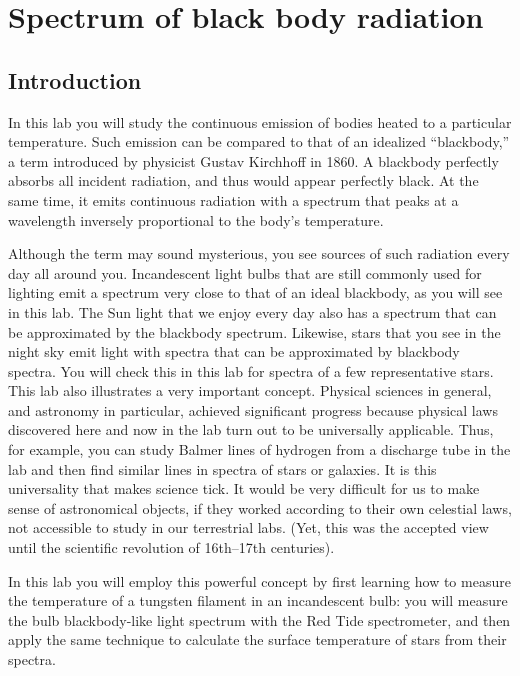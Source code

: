 \newlength{\taskspace}
\setlength{\taskspace}{-.2in}


\chapter{Spectrum of black body radiation}

\section{Introduction}

In this lab you will study the continuous emission of bodies heated to a particular temperature. Such emission can be compared to that of an idealized ``blackbody,'' a term introduced by physicist Gustav Kirchhoff in 1860. A blackbody perfectly absorbs all incident radiation, and thus would appear perfectly black. At the same time, it emits continuous radiation with a spectrum that peaks at a wavelength inversely proportional to the body's temperature.

Although the term may sound mysterious, you see sources of such radiation every day all around you. Incandescent light bulbs that are still commonly used for lighting emit a spectrum very close to that of an ideal blackbody, as you will see in this lab. The Sun light that we enjoy every day also has a spectrum that can be approximated by the blackbody spectrum. Likewise, stars that you see in the night sky emit light with spectra that can be approximated by blackbody spectra. You will check this in this lab for spectra of a few representative stars. This lab also illustrates a very important concept. Physical sciences in general, and astronomy in particular, achieved significant progress because physical laws discovered here and now in the lab turn out to be universally applicable. Thus, for example, you can study Balmer lines of hydrogen from a discharge tube in the lab and then find similar lines in spectra of stars or galaxies. It is this universality that makes science tick. It would be very difficult for us to make sense of astronomical objects, if they worked according to their own
celestial laws, not accessible to study in our terrestrial labs. (Yet, this was the accepted view until the scientific revolution of 16th--17th centuries).

In this lab you will employ this powerful concept by first learning how to measure the temperature of a tungsten filament in an incandescent bulb: you will measure the bulb blackbody-like light spectrum with the Red Tide spectrometer, and then apply the same technique to calculate the surface temperature of stars from their spectra.

